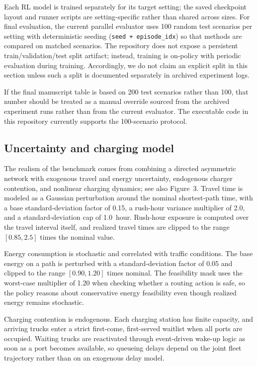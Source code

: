 Each RL model is trained separately for its target setting; the saved checkpoint layout and runner scripts are setting-specific rather than shared across sizes. For final evaluation, the current parallel evaluator uses 100 random test scenarios per setting with deterministic seeding (\texttt{seed + episode\_idx}) so that methods are compared on matched scenarios. The repository does not expose a persistent train/validation/test split artifact; instead, training is on-policy with periodic evaluation during training. Accordingly, we do not claim an explicit split in this section unless such a split is documented separately in archived experiment logs.

If the final manuscript table is based on 200 test scenarios rather than 100, that number should be treated as a manual override sourced from the archived experiment runs rather than from the current evaluator. The executable code in this repository currently supports the 100-scenario protocol.

\subsection{Uncertainty and charging model}
\label{sec:uncertainty-model}

The realism of the benchmark comes from combining a directed asymmetric network with exogenous travel and energy uncertainty, endogenous charger contention, and nonlinear charging dynamics; see also Figure~3. Travel time is modeled as a Gaussian perturbation around the nominal shortest-path time, with a base standard-deviation factor of 0.15, a rush-hour variance multiplier of 2.0, and a standard-deviation cap of 1.0~hour. Rush-hour exposure is computed over the travel interval itself, and realized travel times are clipped to the range $[0.85, 2.5]$ times the nominal value.

Energy consumption is stochastic and correlated with traffic conditions. The base energy on a path is perturbed with a standard-deviation factor of 0.05 and clipped to the range $[0.90, 1.20]$ times nominal. The feasibility mask uses the worst-case multiplier of 1.20 when checking whether a routing action is safe, so the policy reasons about conservative energy feasibility even though realized energy remains stochastic.

Charging contention is endogenous. Each charging station has finite capacity, and arriving trucks enter a strict first-come, first-served waitlist when all ports are occupied. Waiting trucks are reactivated through event-driven wake-up logic as soon as a port becomes available, so queueing delays depend on the joint fleet trajectory rather than on an exogenous delay model.

